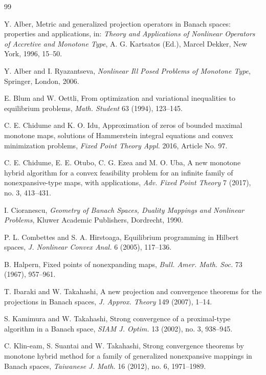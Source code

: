 \documentclass[leqno,12pt]{amsart}
\theoremstyle{definition}
\numberwithin{equation}{section}
\begin{document}
\begin{thebibliography}{99}

Y. Alber, Metric and generalized projection operators in Banach spaces: properties and applications, in: \emph{Theory and Applications of Nonlinear Operators of Accretive and Monotone Type}, A. G. Kartsatos (Ed.), Marcel Dekker, New York, 1996, 15--50.

Y. Alber and I. Ryazantseva, \emph{Nonlinear Ill Posed Problems of Monotone Type}, Springer, London, 2006.

E. Blum and W. Oettli, From optimization and variational inequalities to equilibrium problems, \emph{Math. Student} 63 (1994), 123--145.

C. E. Chidume and K. O. Idu, Approximation of zeros of bounded maximal monotone maps, solutions of Hammerstein integral equations and convex minimization problems, \emph{Fixed Point Theory Appl.} 2016, Article No. 97.

C. E. Chidume, E. E. Otubo, C. G. Ezea and M. O. Uba, A new monotone hybrid algorithm for a convex feasibility problem for an infinite family of nonexpansive-type maps, with applications, \emph{Adv. Fixed Point Theory} 7 (2017), no. 3, 413--431.

I. Cioranescu, \emph{Geometry of Banach Spaces, Duality Mappings and Nonlinear Problems}, Kluwer Academic Publishers, Dordrecht, 1990.

P. L. Combettes and S. A. Hirstoaga, Equilibrium programming in Hilbert spaces, \emph{J. Nonlinear Convex Anal.} 6 (2005), 117--136.

B. Halpern, Fixed points of nonexpanding maps, \emph{Bull. Amer. Math. Soc.} 73 (1967), 957--961.

T. Ibaraki and W. Takahashi, A new projection and convergence theorems for the projections in Banach spaces, \emph{J. Approx. Theory} 149 (2007), 1--14.

S. Kamimura and W. Takahashi, Strong convergence of a proximal-type algorithm in a Banach space, \emph{SIAM J. Optim.} 13 (2002), no. 3, 938--945.

C. Klin-eam, S. Suantai and W. Takahashi, Strong convergence theorems by monotone hybrid method for a family of generalized nonexpansive mappings in Banach spaces, \emph{Taiwanese J. Math.} 16 (2012), no. 6, 1971--1989.


\end{thebibliography}
\end{document}
